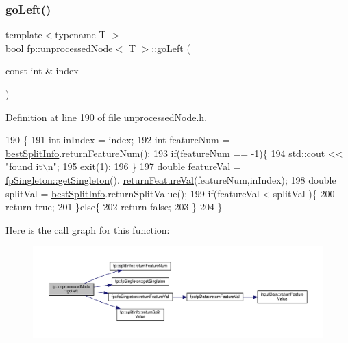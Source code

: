 \subsubsection{\texorpdfstring{go\+Left()}{goLeft()}}
{\footnotesize\ttfamily template$<$typename T $>$ \\
bool \hyperlink{classfp_1_1unprocessedNode}{fp\+::unprocessed\+Node}$<$ T $>$\+::go\+Left (\begin{DoxyParamCaption}\item[{const int \&}]{index }\end{DoxyParamCaption})\hspace{0.3cm}{\ttfamily [inline]}}



Definition at line 190 of file unprocessed\+Node.\+h.


\begin{DoxyCode}
190                                     \{
191     \textcolor{keywordtype}{int} inIndex = index;
192     \textcolor{keywordtype}{int} featureNum = \hyperlink{classfp_1_1unprocessedNode_a9146bd750d1f533e712634873551d060}{bestSplitInfo}.returnFeatureNum();
193     \textcolor{keywordflow}{if}(featureNum == -1)\{
194         std::cout << \textcolor{stringliteral}{"found it\(\backslash\)n"};
195         exit(1);
196     \}
197     \textcolor{keywordtype}{double} featureVal = \hyperlink{classfp_1_1fpSingleton_a8bdae77b68521003e3fc630edec2e240}{fpSingleton::getSingleton}().
      \hyperlink{classfp_1_1fpSingleton_aacc2eb894a219e2fe234743b51fa1a76}{returnFeatureVal}(featureNum,inIndex);
198         \textcolor{keywordtype}{double} splitVal = \hyperlink{classfp_1_1unprocessedNode_a9146bd750d1f533e712634873551d060}{bestSplitInfo}.returnSplitValue();
199                     \textcolor{keywordflow}{if}(featureVal < splitVal )\{
200                         \textcolor{keywordflow}{return} \textcolor{keyword}{true};
201                     \}\textcolor{keywordflow}{else}\{
202                         \textcolor{keywordflow}{return} \textcolor{keyword}{false};
203                     \}
204                 \}
\end{DoxyCode}
Here is the call graph for this function\+:\nopagebreak
\begin{figure}[H]
\begin{center}
\leavevmode
\includegraphics[width=350pt]{classfp_1_1unprocessedNode_ad4ffdb4f4b91d6d21f8954f3c80a3617_cgraph}
\end{center}
\end{figure}
\mbox{\label{classfp_1_1unprocessedNode_a8cedeb8c4c88345ff97f9afb89b3ccd0}} 

